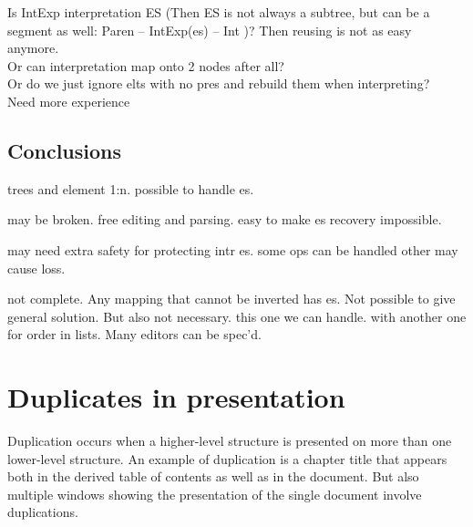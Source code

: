 Is IntExp interpretation ES (Then ES is not always a subtree, but can be a segment as well: Paren -- IntExp(es) -- Int )? Then reusing is not as easy anymore.\\
Or can interpretation map onto 2 nodes after all?\\
Or do we just ignore elts with no pres and rebuild them when interpreting?\\
Need more experience





\subsection{Conclusions}

trees and element 1:n. possible to handle es.

may be broken. free editing and parsing. easy to make es recovery impossible.

may need extra safety for protecting intr es. some ops can be handled other may cause loss.

not complete. Any mapping that cannot be inverted has es. Not possible to give general solution. But also not necessary. this one we can handle. with another one for order in lists. Many editors can be spec'd.






%																
%																
%																
\section{Duplicates in presentation}


Duplication occurs when a higher-level structure is presented on more than one lower-level structure. An example of duplication is a chapter title that appears both in the derived table of contents as well as in the document. But also multiple windows showing the presentation of the single document involve duplications.

